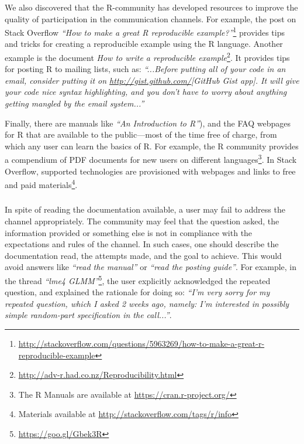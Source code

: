 We also discovered that the R-community has developed resources to improve the quality of participation in the communication channels.
    For example, the post on Stack Overflow \textit{``How to make a great R reproducible example?''}\footnote{\href{http://stackoverflow.com/questions/5963269/how-to-make-a-great-r-reproducible-example}{http://stackoverflow.com/questions/5963269/how-to-make-a-great-r-reproducible-example}} provides tips and tricks for creating a reproducible example using the R language.
    Another example is the document \emph{How to write a reproducible
      example}\footnote{\url{http://adv-r.had.co.nz/Reproducibility.html}}.
    It provides tips for posting R to mailing lists, such as: \textit{``...Before putting all of your code in an email, consider putting it on \url{http://gist.github.com/}{[GitHub Gist app]}. It will give your code nice syntax highlighting, and you don't have to worry about anything getting mangled by the email system...''}

    Finally, there are manuals like \textit{``An Introduction to R''}), and the FAQ webpages for R that are available to the public---most of the time free of charge,
    from which any user can learn the basics of R.
    For example, the R community provides a compendium of PDF documents for new users on different languages\footnote{The R Manuals are available at \url{https://cran.r-project.org/}}.
    In Stack Overflow, supported technologies are provisioned with webpages and links to free and paid materials\footnote{Materials available at \url{http://stackoverflow.com/tags/r/info}}.



\subsubsection{\recc}

    In spite of reading the documentation available, a user may fail to address the channel appropriately.
    The community may feel that the question asked, the information provided or something else is not in compliance with the expectations and rules of the channel.
    In such cases, one should describe the documentation read, the attempts made, and the goal to achieve.
    This would avoid answers like \textit{``read the manual''} or \textit{``read the posting guide''}. %
    For example, in the thread \textit{``lme4 GLMM''}\footnote{\url{https://goo.gl/Gbek3R}}, the user explicitly acknowledged the repeated question, and explained the rationale for doing so: \textit{``I'm very sorry for my repeated question, which I asked 2 weeks ago, namely: I'm interested in possibly simple random-part specification in the call...''}.


